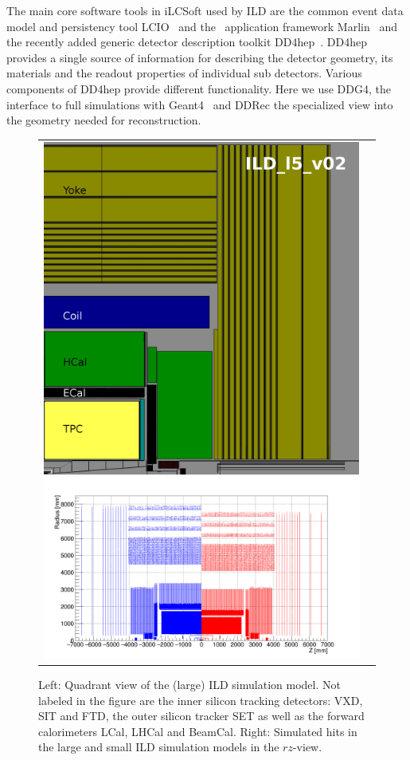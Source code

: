 The main core software tools in iLCSoft used by ILD are the common event data model and persistency tool LCIO~\cite{Gaede:2003ip}
and the \CPP\ application framework Marlin~\cite{Gaede:2006pj} and the recently added generic detector description toolkit
DD4hep~\cite{Frank:2014zya,Frank:2015ivo}. DD4hep provides a single source of information for describing the detector geometry, its
materials and the readout properties of individual sub detectors. Various components of DD4hep provide different functionality.
Here we use DDG4, the interface to full simulations with Geant4~\cite{Agostinelli:2002hh} and DDRec the specialized view into the
geometry needed for reconstruction.
%
\begin{figure}[b!]
\begin{tabular}{cc}
\includegraphics[width=0.45\hsize]{Modelling/fig/ILD_l5_v02_sideview_gimp_2.jpg}
\includegraphics[width=0.55\hsize]{Modelling/fig/hits_rz_small_large_ILD.png}
\caption{\label{fig:sim_model_quad}Left: Quadrant view of the (large) ILD simulation model. Not labeled in the figure are the inner
  silicon tracking detectors: VXD, SIT and FTD, the outer silicon tracker SET as well as the forward calorimeters LCal, LHCal and BeamCal.
  Right: Simulated hits in the large and small ILD simulation models in the $rz$-view.
}
\end{tabular}
\end{figure}


